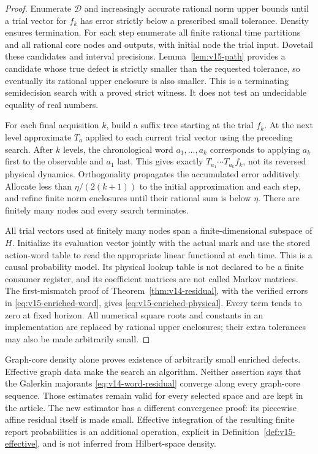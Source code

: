 \begin{proof}
Enumerate $\mathscr D$ and increasingly accurate rational norm
upper bounds until a trial vector for $f_k$ has error strictly below
a prescribed small tolerance. Density ensures termination. For each
step enumerate all finite rational time partitions and all rational
core nodes and outputs, with initial node the trial input. Dovetail
these candidates and interval precisions. Lemma~\ref{lem:v15-path}
provides a candidate whose true defect is strictly smaller than the
requested tolerance, so eventually its rational upper enclosure is
also smaller. This is a terminating semidecision search with a proved
strict witness. It does not test an undecidable equality of real
numbers.

For each final acquisition $k$, build a suffix tree starting at the
trial $f_k$. At the next level approximate $T_a$ applied to each
current trial vector using the preceding search. After $k$ levels,
the chronological word $a_1,\ldots,a_k$ corresponds to applying
$a_k$ first to the observable and $a_1$ last. This gives exactly
$T_{a_1}\cdots T_{a_k}f_k$, not its reversed physical dynamics.
Orthogonality propagates the accumulated error additively. Allocate
less than $\eta/(2(k+1))$ to the initial approximation and each step,
and refine finite norm enclosures until their rational sum is below
$\eta$. There are finitely many nodes and every search terminates.

All trial vectors used at finitely many nodes span a finite-dimensional
subspace of $H$. Initialize its evaluation vector jointly with the
actual mark and use the stored action-word table to read the appropriate
linear functional at each time. This is a causal probability model.
Its physical lookup table is not declared to be a finite consumer
register, and its coefficient matrices are not called Markov matrices.
The first-mismatch proof of Theorem~\ref{thm:v14-residual}, with the
verified errors in \eqref{eq:v15-enriched-word}, gives
\eqref{eq:v15-enriched-physical}. Every term tends to zero at fixed
horizon. All numerical square roots and constants in an implementation
are replaced by rational upper enclosures; their extra tolerances may
also be made arbitrarily small.
\end{proof}

\begin{remark}
Graph-core density alone proves existence of arbitrarily small enriched
defects. Effective graph data make the search an algorithm. Neither
assertion says that the Galerkin majorants
\eqref{eq:v14-word-residual} converge along every graph-core sequence.
Those estimates remain valid for every selected space and are kept in
the article. The new estimator has a different convergence proof: its
piecewise affine residual itself is made small. Effective integration
of the resulting finite report probabilities is an additional operation,
explicit in Definition~\ref{def:v15-effective}, and is not inferred
from Hilbert-space density.
\end{remark}

